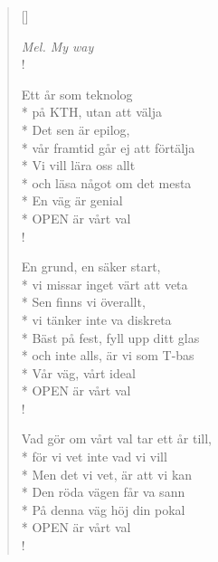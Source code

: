 
\settowidth{\versewidth}{vår framtid går ej att förtälja}


\begin{verse}[\versewidth]

\flagverse{}
\emph{Mel. My way}\\!

Ett år som teknolog\\*
på KTH, utan att välja\\*
Det sen är epilog,\\*
vår framtid går ej att förtälja\\*
Vi vill lära oss allt\\*
och läsa något om det mesta\\*
En väg är genial\\*
OPEN är vårt val\\!


En grund, en säker start,\\*
vi missar inget värt att veta\\*
Sen finns vi överallt,\\*
vi tänker inte va diskreta\\*
Bäst på fest, fyll upp ditt glas\\*
och inte alls, är vi som T-bas\\*
Vår väg, vårt ideal\\*
OPEN är vårt val\\!


Vad gör om vårt val tar ett år till,\\*
för vi vet inte vad vi vill\\*
Men det vi vet, är att vi kan\\*
Den röda vägen får va sann\\*
På denna väg höj din pokal\\*
OPEN är vårt val\\!



\end{verse}